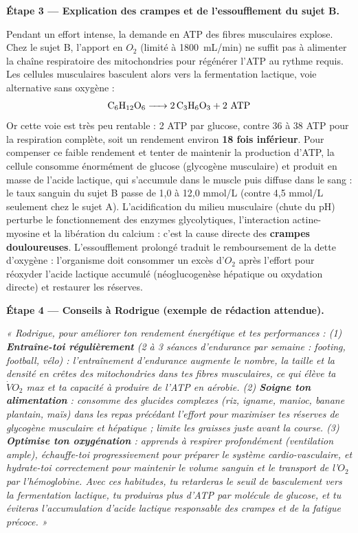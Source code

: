 \documentclass[11pt]{article}
\newcommand{\cle}[1]{{\popxbold\color{popdark}#1}}
\begin{document}
\begin{exoresolu}
\textbf{Étape 3 — Explication des crampes et de l'essoufflement du sujet B.}

Pendant un effort intense, la demande en ATP des fibres musculaires explose. Chez le sujet B, l'apport en $O_2$ (limité à \SI{1800}{mL/min}) ne suffit pas à alimenter la chaîne respiratoire des mitochondries pour régénérer l'ATP au rythme requis. Les cellules musculaires basculent alors vers la \cle{fermentation lactique}, voie alternative sans oxygène :
\[ \ce{C6H12O6 -> 2 C3H6O3} + 2 \text{ ATP} \]
Or cette voie est très peu rentable : 2 ATP par glucose, contre 36 à 38 ATP pour la respiration complète, soit un rendement environ \textbf{18 fois inférieur}. Pour compenser ce faible rendement et tenter de maintenir la production d'ATP, la cellule consomme énormément de glucose (glycogène musculaire) et produit en masse de l'\cle{acide lactique}, qui s'accumule dans le muscle puis diffuse dans le sang : le taux sanguin du sujet B passe de 1,0 à 12,0 mmol/L (contre 4,5 mmol/L seulement chez le sujet A).
L'acidification du milieu musculaire (chute du pH) perturbe le fonctionnement des enzymes glycolytiques, l'interaction actine-myosine et la libération du calcium : c'est la cause directe des \textbf{crampes douloureuses}. L'essoufflement prolongé traduit le remboursement de la \cle{dette d'oxygène} : l'organisme doit consommer un excès d'$O_2$ après l'effort pour réoxyder l'acide lactique accumulé (néoglucogenèse hépatique ou oxydation directe) et restaurer les réserves.

\textbf{Étape 4 — Conseils à Rodrigue (exemple de rédaction attendue).}

\emph{« Rodrigue, pour améliorer ton rendement énergétique et tes performances : (1) \textbf{Entraîne-toi régulièrement} (2 à 3 séances d'endurance par semaine : footing, football, vélo) : l'entraînement d'endurance augmente le nombre, la taille et la densité en crêtes des mitochondries dans tes fibres musculaires, ce qui élève ta $\dot{V}O_2$ max et ta capacité à produire de l'ATP en aérobie. (2) \textbf{Soigne ton alimentation} : consomme des glucides complexes (riz, igname, manioc, banane plantain, maïs) dans les repas précédant l'effort pour maximiser tes réserves de glycogène musculaire et hépatique ; limite les graisses juste avant la course. (3) \textbf{Optimise ton oxygénation} : apprends à respirer profondément (ventilation ample), échauffe-toi progressivement pour préparer le système cardio-vasculaire, et hydrate-toi correctement pour maintenir le volume sanguin et le transport de l'$O_2$ par l'hémoglobine. Avec ces habitudes, tu retarderas le seuil de basculement vers la fermentation lactique, tu produiras plus d'ATP par molécule de glucose, et tu éviteras l'accumulation d'acide lactique responsable des crampes et de la fatigue précoce. »}
\end{exoresolu}
\end{document}
